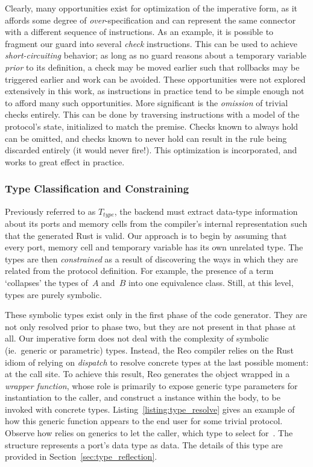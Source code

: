 Clearly, many opportunities exist for optimization of the imperative form, as it affords some degree of \textit{over}-specification and can represent the same connector with a different sequence of instructions. As an example, it is possible to fragment our guard into several \textit{check} instructions. This can be used to achieve \textit{short-circuiting} behavior; as long as no guard reasons about a temporary variable \textit{prior} to its definition, a check may be moved earlier such that rollbacks may be triggered earlier and work can be avoided. These opportunities were not explored extensively in this work, as instructions in practice tend to be simple enough not to afford many such opportunities.
More significant is the \textit{omission} of trivial checks entirely. This can be done by traversing instructions with a model of the protocol's state, initialized to match the premise. Checks known to always hold can be omitted, and checks known to never hold can result in the rule being discarded entirely (it would never fire!). This optimization is incorporated, and works to great effect in practice.


\subsubsection{Type Classification and Constraining}
Previously referred to as $T_{type}$, the backend must extract data-type information about its ports and memory cells from the compiler's internal representation such that the generated Rust is valid. Our approach is to begin by assuming that every port, memory cell and temporary variable has its own unrelated type. The types are then \textit{constrained} as a result of discovering the ways in which they are related from the protocol definition. For example, the presence of a term  `collapses' the types of~$A$ and~$B$ into one equivalence class. Still, at this level, types are purely symbolic. 

These symbolic types exist only in the first phase of the code generator. They are not only resolved prior to phase two, but they are not present in that phase at all. Our imperative form does not deal with the complexity of symbolic (ie.\ generic or parametric) types. Instead, the Reo compiler relies on the Rust idiom of relying on \textit{dispatch} to resolve concrete types at the last possible moment: at the call site. To achieve this result, Reo generates the  object wrapped in a \textit{wrapper function}, whose role is primarily to expose generic type parameters for instantiation to the caller, and construct a  instance within the body, to be invoked with concrete types. Listing~\ref{listing:type_resolve} gives an example of how this generic function appears to the end user for some trivial protocol. Observe how  relies on generics to let the caller,  which type to select for~. The  structure represents a port's data type as data. The details of this type are provided in Section~\ref{sec:type_reflection}.


